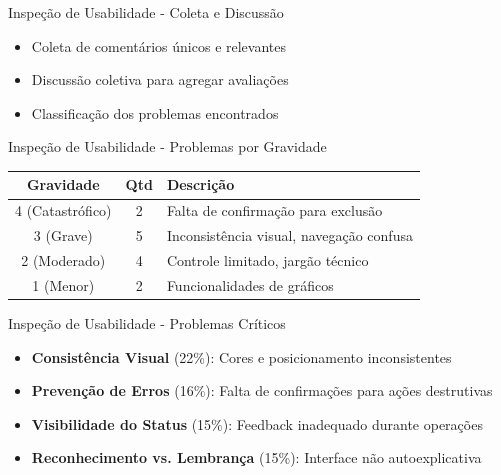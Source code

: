 \documentclass[landscape, 12pt]{beamer}
\begin{document}
\begin{frame}{Inspeção de Usabilidade - Coleta e Discussão}
    \begin{itemize}
        \item Coleta de comentários únicos e relevantes
        \item Discussão coletiva para agregar avaliações
        \item Classificação dos problemas encontrados
    \end{itemize}
\end{frame}

\begin{frame}{Inspeção de Usabilidade - Problemas por Gravidade}
    \begin{center}
        \begin{tabularx}{0.95\textwidth}{|c|c|X|}
            \hline
            \textbf{Gravidade} & \textbf{Qtd} & \textbf{Descrição} \\
            \hline
            4 (Catastrófico) & 2 & Falta de confirmação para exclusão \\
            \hline
            3 (Grave) & 5 & Inconsistência visual, navegação confusa \\
            \hline
            2 (Moderado) & 4 & Controle limitado, jargão técnico \\
            \hline
            1 (Menor) & 2 & Funcionalidades de gráficos \\
            \hline
        \end{tabularx}
    \end{center}
\end{frame}

\begin{frame}{Inspeção de Usabilidade - Problemas Críticos}
    \begin{itemize}
        \item \textbf{Consistência Visual} (22\%): Cores e posicionamento inconsistentes
        \item \textbf{Prevenção de Erros} (16\%): Falta de confirmações para ações destrutivas
        \item \textbf{Visibilidade do Status} (15\%): Feedback inadequado durante operações
        \item \textbf{Reconhecimento vs. Lembrança} (15\%): Interface não autoexplicativa
    \end{itemize}
\end{frame}
\end{document}
